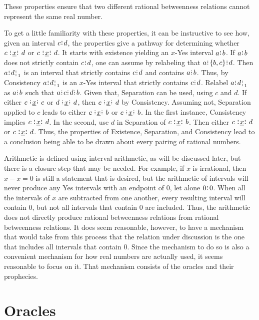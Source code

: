 \documentclass[12pt]{article}
\begin{document}
These properties ensure that two different rational betweenness relations cannot represent the same real number. 

To get a little familiarity with these properties, it can be instructive to see how, given an interval $c\rint d$, the properties give a pathway for determining whether $c \xrel d$ or \sout{$c \xrel d$}. It starts with existence yielding an $x$-Yes interval $a\rint b$. If $a\rint b$ does not strictly contain $c\rint d$, one can assume by relabeling that $a\rint \{b, c\} \rint d$. Then $a\rint \fuzbright[1]{d}$ is an interval that strictly contains $c\rint d$ and contains $a\rint b$. Thus, by Consistency $a\rint \fuzbright[1]{d}$ is an $x$-Yes interval that strictly contains $c\rint d$. Relabel $a\rint \fuzbright[1]{d}$ as $a\rint b$ such that $a\rint c\rint d\rint b$. Given that, Separation can be used, using $c$ and $d$. If either $c \xrel c$ or $d \xrel d$, then $c \xrel d$ by Consistency. Assuming  not, Separation applied to $c$ leads to either \sout{$c \xrel b$} or $c \xrel b$. In the first instance, Consistency implies \sout{$c \xrel d$}. In the second, use $d$ in Separation of $c \xrel b$. Then either $c \xrel d$ or \sout{$c \xrel d$}. Thus, the properties of Existence, Separation, and Consistency lead to a conclusion being able to be drawn about every pairing of rational numbers. 


Arithmetic is defined using interval arithmetic, as will be discussed later, but there is a closure step that may be needed. For example, if $x$ is irrational, then $x - x = 0$ is still a statement that is desired, but the arithmetic of intervals will never produce any Yes intervals with an endpoint of $0$, let alone $0\rint 0$. When all the intervals of $x$ are subtracted from one another, every resulting interval will contain $0$, but not all intervals that contain 0 are included. Thus, the arithmetic does not directly produce rational betweenness relations from rational betweenness relations. It does seem reasonable, however, to have a mechanism that would take from this process that the relation under discussion is the one that includes all intervals that contain $0$. Since the mechanism to do so is also a convenient mechanism for how real numbers are actually used, it seems reasonable to focus on it. That mechanism consists of the oracles and their prophecies. 

\section{Oracles}
\end{document}
